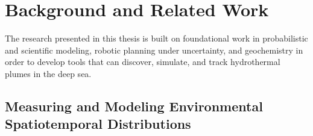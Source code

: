 \chapter{Background and Related Work}
\label{chap:related_work}

The research presented in this thesis is built on foundational work in probabilistic and scientific modeling, robotic planning under uncertainty, and geochemistry in order to develop tools that can discover, simulate, and track hydrothermal plumes in the deep sea.

\section{Measuring and Modeling Environmental Spatiotemporal Distributions}
\label{sec:measure_and_model}

